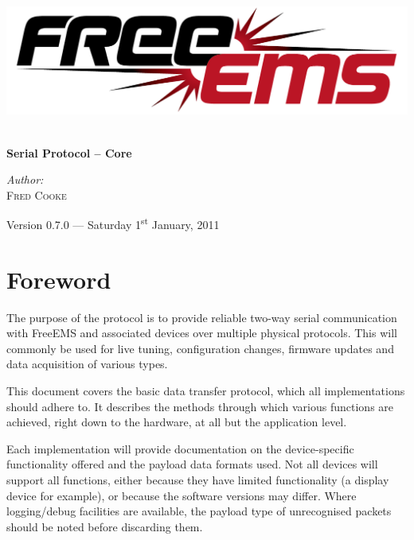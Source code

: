 \documentclass[12pt,a4paper,titlepage]{article}
\begin{document}
\begin{titlepage} 
\begin{center}

\includegraphics[width=1\textwidth]{./logos/freeems}\\[1cm] \vfill

\HRule \\[0.8cm]
{ \huge \bfseries Serial Protocol -- Core}\\[0.4cm]
\HRule \vfill

\Large \emph{Author:}\\
\textsc{Fred Cooke} \vfill

{\large Version 0.7.0 --- Saturday 1\textsuperscript{st} January, 2011}






\section {Foreword}

The purpose of the protocol is to provide reliable two-way serial communication
with FreeEMS and associated devices over multiple physical protocols. This will
commonly be used for live tuning, configuration changes, firmware updates and
data acquisition of various types.

This document covers the basic data transfer protocol, which all
implementations should adhere to. It describes the methods through which
various functions are achieved, right down to the hardware, at all but the
application level.

Each implementation will provide documentation on the device-specific
functionality offered and the payload data formats used. Not all devices
will support all functions, either because they have limited functionality
(a display device for example), or because the software versions may differ.
Where logging/debug facilities are available, the payload type of unrecognised
packets should be noted before discarding them.





\end{center}
\end{titlepage}
\end{document}
